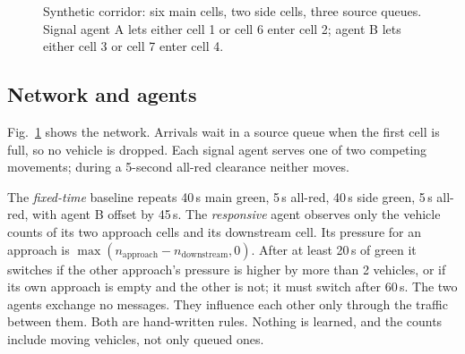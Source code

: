 \documentclass[conference]{IEEEtran}
\begin{document}
\begin{figure}[t]\centering
{}
\caption{Synthetic corridor: six main cells, two side cells, three source queues. Signal agent A lets either cell 1 or cell 6 enter cell 2; agent B lets either cell 3 or cell 7 enter cell 4.}\label{fig:corridor}
\end{figure}

\subsection{Network and agents}
Fig.~\ref{fig:corridor} shows the network. Arrivals wait in a source queue when the first cell is full, so no vehicle is dropped. Each signal agent serves one of two competing movements; during a 5-second all-red clearance neither moves.

The \emph{fixed-time} baseline repeats 40\,s main green, 5\,s all-red, 40\,s side green, 5\,s all-red, with agent B offset by 45\,s. The \emph{responsive} agent observes only the vehicle counts of its two approach cells and its downstream cell. Its pressure for an approach is $\max(n_{\mathrm{approach}}-n_{\mathrm{downstream}},0)$. After at least 20\,s of green it switches if the other approach's pressure is higher by more than 2 vehicles, or if its own approach is empty and the other is not; it must switch after 60\,s. The two agents exchange no messages. They influence each other only through the traffic between them. Both are hand-written rules. Nothing is learned, and the counts include moving vehicles, not only queued ones.
\end{document}
